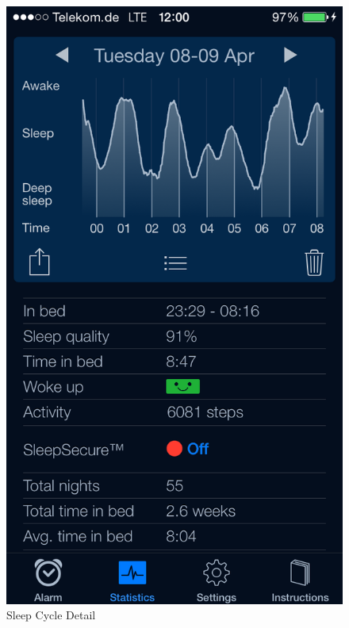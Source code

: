 \begin{figure}[]
  \centering
  \begin{minipage}[b]{0.47\textwidth}
    \centering
    \includegraphics[scale=0.3]{images/SleepCycle/Detail} 
    \caption{Sleep Cycle Detail}
    \label{fig:SCDetail}
  \end{minipage}
  \begin{minipage}[b]{0.47\textwidth}
    \centering

\end{minipage}
\end{figure}
